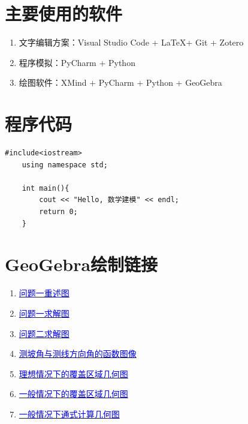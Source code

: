 


\nocite{*}


\appendix
\section{主要使用的软件}

\begin{enumerate}
    \item 文字编辑方案：Visual Studio Code + \LaTeX + Git + Zotero
    \item 程序模拟：PyCharm + Python
    \item 绘图软件：XMind + PyCharm + Python + GeoGebra
\end{enumerate}

\section{程序代码}

\begin{lstlisting}[caption={类的定义语句}]
    #include<iostream>
    using namespace std;

    int main(){
        cout << "Hello, 数学建模" << endl;
        return 0;
    }
\end{lstlisting}

\section{GeoGebra绘制链接}

\begin{enumerate}
    \item \href{https://www.geogebra.org/m/fza22fcy}{\textcolor{blue}{问题一重述图}}
    \item \href{https://www.geogebra.org/m/hpkkarys}{\textcolor{blue}{问题一求解图}}
    \item \href{https://www.geogebra.org/m/f6kfjvru}{\textcolor{blue}{问题二求解图}}
    \item \href{https://www.geogebra.org/m/n8saurfn}{\textcolor{blue}{测坡角与测线方向角的函数图像}}
    \item \href{https://www.geogebra.org/m/xcvstdzg}{\textcolor{blue}{理想情况下的覆盖区域几何图}}
    \item \href{https://www.geogebra.org/m/absuxwpk}{\textcolor{blue}{一般情况下的覆盖区域几何图}}
    \item \href{https://www.geogebra.org/m/jzwhwcqr}{\textcolor{blue}{一般情况下通式计算几何图}}
\end{enumerate}

